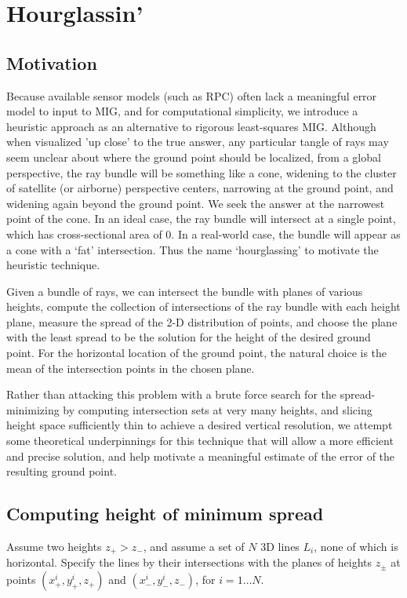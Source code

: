 \documentclass{amsart}
\begin{document}
\section{Hourglassin'}
\subsection{Motivation}
Because available sensor models (such as RPC) often lack a meaningful
error model to input to MIG, and for computational simplicity, we
introduce a heuristic approach as an alternative to rigorous
least-squares MIG. Although when visualized 'up close' to the true
answer, any particular tangle of rays may seem unclear about where the
ground point should be localized, from a global perspective, the ray
bundle will be something like a cone, widening to the cluster of
satellite (or airborne) perspective centers, narrowing at the ground
point, and widening again beyond the ground point. We seek the answer
at the narrowest point of the cone. In an ideal case, the ray bundle
will intersect at a single point, which has cross-sectional area of
0. In a real-world case, the bundle will appear as a cone with a `fat'
intersection. Thus the name `hourglassing' to motivate the heuristic
technique.

Given a bundle of rays, we can intersect the bundle with planes of
various heights, compute the collection of intersections of the ray
bundle with each height plane, measure the spread of the 2-D
distribution of points, and choose the plane with the least spread to
be the solution for the height of the desired ground point. For the
horizontal location of the ground point, the natural choice is the
mean of the intersection points in the chosen plane.

Rather than attacking this problem with a brute force search for the
spread-minimizing by computing intersection sets at very many heights,
and slicing height space sufficiently thin to achieve a desired
vertical resolution, we attempt some theoretical underpinnings for
this technique that will allow a more efficient and precise solution,
and help motivate a meaningful estimate of the error of the resulting
ground point.

\subsection{Computing height of minimum spread}
Assume two heights $z_{+} > z_{-}$, and assume a set of $N$ 3D lines
$L_i$, none of which is horizontal. Specify the lines by their
intersections with the planes of heights $z_\pm$ at points
$(x_{+}^{i},y_{+}^{i}, z_+)$ and $(x_{-}^{i},y_{-}^{i}, z_-)$, for
$i=1\ldots N$.
\end{document}
